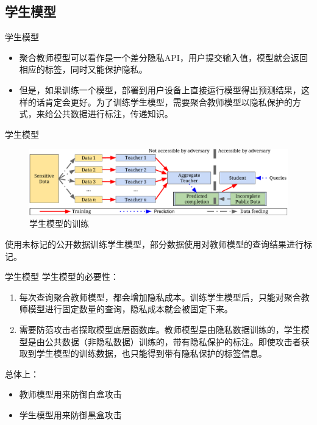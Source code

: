 \documentclass[aspectratio=169]{beamer}
\begin{document}
\subsection{学生模型}
\begin{frame}{学生模型}
\begin{itemize}
\item 聚合教师模型可以看作是一个差分隐私API，用户提交输入值，模型就会返回相应的标签，同时又能保护隐私。
\item 但是，如果训练一个模型，部署到用户设备上直接运行模型得出预测结果，这样的话肯定会更好。为了训练学生模型，需要聚合教师模型以隐私保护的方式，来给公共数据进行标注，传递知识。
\end{itemize}
\end{frame}

\begin{frame}{学生模型}
\begin{figure}[!h]
\includegraphics[width = \linewidth]{fig/approach-overview.pdf}
\caption{学生模型的训练}
\label{fig:overview}
\end{figure}
使用未标记的公开数据训练学生模型，部分数据使用对教师模型的查询结果进行标记。
\end{frame}

\begin{frame}{学生模型}
学生模型的必要性：
\begin{enumerate}
\item 每次查询聚合教师模型，都会增加隐私成本。训练学生模型后，只能对聚合教师模型进行固定数量的查询，隐私成本就会被固定下来。
\item 需要防范攻击者探取模型底层函数库。教师模型是由隐私数据训练的，学生模型是由公共数据（非隐私数据）训练的，带有隐私保护的标注。即使攻击者获取到学生模型的训练数据，也只能得到带有隐私保护的标签信息。
\end{enumerate}
总体上：
\begin{itemize}
\item 教师模型用来防御白盒攻击
\item 学生模型用来防御黑盒攻击
\end{itemize}
\end{frame}
\end{document}
